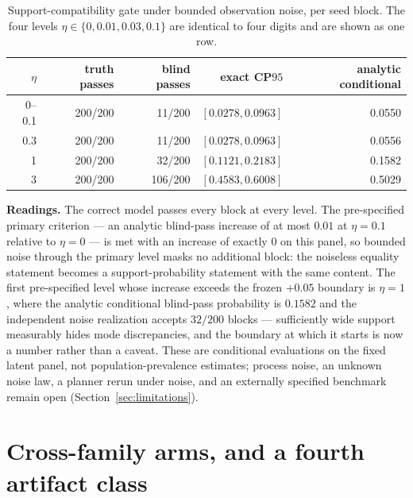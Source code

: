 \documentclass[11pt]{article}
\theoremstyle{definition}
\theoremstyle{remark}
\begin{document}
\begin{table}[ht]
\centering
\small
\begin{tabular}{rrrrr}
\toprule
$\eta$ & truth passes & blind passes & exact CP$95$ & analytic conditional \\
\midrule
0--0.1 & 200/200 & 11/200 & $[0.0278, 0.0963]$ & 0.0550 \\
0.3 & 200/200 & 11/200 & $[0.0278, 0.0963]$ & 0.0556 \\
1 & 200/200 & 32/200 & $[0.1121, 0.2183]$ & 0.1582 \\
3 & 200/200 & 106/200 & $[0.4583, 0.6008]$ & 0.5029 \\
\bottomrule
\end{tabular}
\caption{Support-compatibility gate under bounded observation noise, per seed block. The four levels $\eta \in \{0, 0.01, 0.03, 0.1\}$ are identical to four digits and are shown as one row.}
\label{tab:noisygate}
\end{table}

\textbf{Readings.} The correct model passes every block at every level. The pre-specified primary criterion --- an analytic blind-pass increase of at most $0.01$ at $\eta = 0.1$ relative to $\eta = 0$ --- is met with an increase of exactly $0$ on this panel, so bounded noise through the primary level masks no additional block: the noiseless equality statement becomes a support-probability statement with the same content. The first pre-specified level whose increase exceeds the frozen $+0.05$ boundary is $\eta = 1$, where the analytic conditional blind-pass probability is $0.1582$ and the independent noise realization accepts $32/200$ blocks --- sufficiently wide support measurably hides mode discrepancies, and the boundary at which it starts is now a number rather than a caveat. These are conditional evaluations on the fixed latent panel, not population-prevalence estimates; process noise, an unknown noise law, a planner rerun under noise, and an externally specified benchmark remain open (Section~\ref{sec:limitations}).

\section{Cross-family arms, and a fourth artifact class}
\label{sup:crossfamily}
\end{document}
